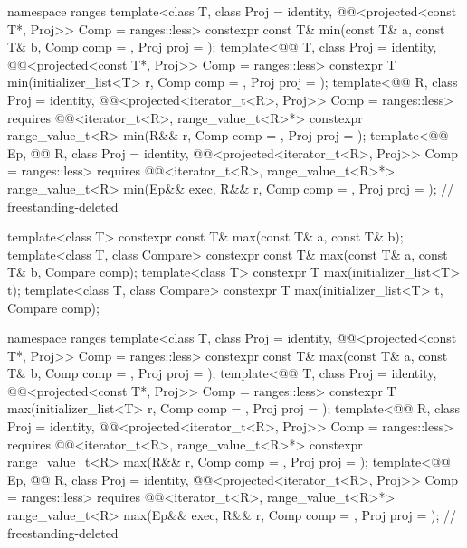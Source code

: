 \begin{codeblock}
{  namespace ranges {
    template<class T, class Proj = identity,
             @@<projected<const T*, Proj>> Comp = ranges::less>
      constexpr const T& min(const T& a, const T& b, Comp comp = {}, Proj proj = {});
    template<@@ T, class Proj = identity,
             @@<projected<const T*, Proj>> Comp = ranges::less>
      constexpr T min(initializer_list<T> r, Comp comp = {}, Proj proj = {});
    template<@@ R, class Proj = identity,
             @@<projected<iterator_t<R>, Proj>> Comp = ranges::less>
      requires @@<iterator_t<R>, range_value_t<R>*>
      constexpr range_value_t<R>
        min(R&& r, Comp comp = {}, Proj proj = {});
    template<@@ Ep, @@ R, class Proj = identity,
             @@<projected<iterator_t<R>, Proj>> Comp = ranges::less>
      requires @@<iterator_t<R>, range_value_t<R>*>
      range_value_t<R>
        min(Ep&& exec, R&& r, Comp comp = {}, Proj proj = {});              // freestanding-deleted
  }

  template<class T> constexpr const T& max(const T& a, const T& b);
  template<class T, class Compare>
    constexpr const T& max(const T& a, const T& b, Compare comp);
  template<class T>
    constexpr T max(initializer_list<T> t);
  template<class T, class Compare>
    constexpr T max(initializer_list<T> t, Compare comp);

  namespace ranges {
    template<class T, class Proj = identity,
             @@<projected<const T*, Proj>> Comp = ranges::less>
      constexpr const T& max(const T& a, const T& b, Comp comp = {}, Proj proj = {});
    template<@@ T, class Proj = identity,
             @@<projected<const T*, Proj>> Comp = ranges::less>
      constexpr T max(initializer_list<T> r, Comp comp = {}, Proj proj = {});
    template<@@ R, class Proj = identity,
             @@<projected<iterator_t<R>, Proj>> Comp = ranges::less>
      requires @@<iterator_t<R>, range_value_t<R>*>
      constexpr range_value_t<R>
        max(R&& r, Comp comp = {}, Proj proj = {});
    template<@@ Ep, @@ R, class Proj = identity,
             @@<projected<iterator_t<R>, Proj>> Comp = ranges::less>
      requires @@<iterator_t<R>, range_value_t<R>*>
      range_value_t<R>
        max(Ep&& exec, R&& r, Comp comp = {}, Proj proj = {});              // freestanding-deleted
  }

}
\end{codeblock}
